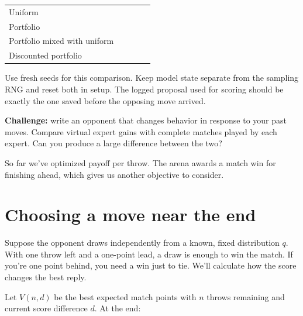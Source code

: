 \documentclass[11pt]{article}
\begin{document}
\smallskip\begingroup\small
\setlength{\tabcolsep}{5pt}
\renewcommand{\arraystretch}{1.17}
\begin{tabularx}{\linewidth}{@{}L{.25\linewidth}YYYY@{}}
\toprule
{} &  &  &  &  \\
\midrule
\rule{0pt}{22pt}Uniform &  &  &  &  \\
\rule{0pt}{22pt}Portfolio &  &  &  &  \\
\rule{0pt}{22pt}Portfolio mixed with uniform &  &  &  &  \\
\rule{0pt}{22pt}Discounted portfolio &  &  &  &  \\
\bottomrule
\end{tabularx}\endgroup\par\smallskip

Use fresh seeds for this comparison. Keep model state separate from the sampling RNG and reset both in setup. The logged proposal used for scoring should be exactly the one saved before the opposing move arrived.


\begin{summit}
\textbf{Challenge:} write an opponent that changes behavior in response to your past moves. Compare virtual expert gains with complete matches played by each expert. Can you produce a large difference between the two?
\end{summit}

So far we've optimized payoff per throw. The arena awards a match win for finishing ahead, which gives us another objective to consider.
\par
\clearpage
\section*{Choosing a move near the end}

\begin{context}
Suppose the opponent draws independently from a known, fixed distribution $q$. With one throw left and a one-point lead, a draw is enough to win the match. If you're one point behind, you need a win just to tie. We'll calculate how the score changes the best reply.

\end{context}


Let $V(n,d)$ be the best expected match points with $n$ throws remaining and current score difference $d$. At the end:
\end{document}
